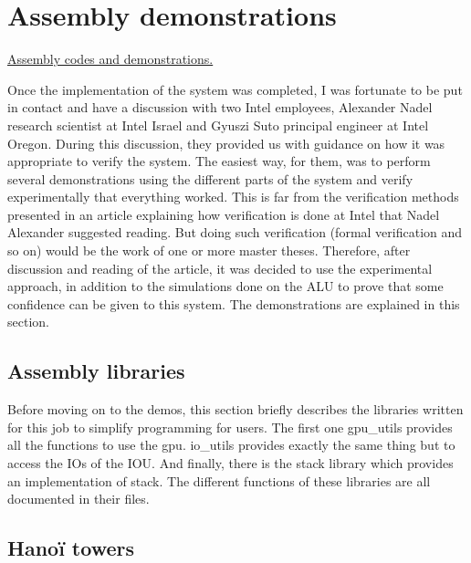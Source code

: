 \section{Assembly demonstrations}

\href{https://github.com/AnotherGitAccount/TFE/tree/master/asm}{Assembly codes and demonstrations.}

Once the implementation of the system was completed, I was fortunate to be put in contact and have 
a discussion with two Intel employees, Alexander Nadel research scientist at Intel Israel and 
Gyuszi Suto principal engineer at Intel Oregon. During this discussion, they provided us with 
guidance on how it was appropriate to verify the system. The easiest way, for them, was to perform 
several demonstrations using the different parts of the system and verify experimentally that 
everything worked. This is far from the verification methods presented in an article \cite{intel} 
explaining how verification is done at Intel that Nadel Alexander suggested reading. But doing such 
verification (formal verification and so on) would be the work of one or more master theses. 
Therefore, after discussion and reading of the article, it was decided to use the experimental 
approach, in addition to the simulations done on the ALU to prove that some confidence can be given 
to this system. The demonstrations are explained in this section.

\subsection{Assembly libraries}

Before moving on to the demos, this section briefly describes the libraries written for this job to 
simplify programming for users. The first one gpu\_utils provides all the functions to use the gpu. 
io\_utils provides exactly the same thing but to access the IOs of the IOU. And finally, there is 
the stack library which provides an implementation of stack. The different functions of these 
libraries are all documented in their files.

\subsection{Hanoï towers}

